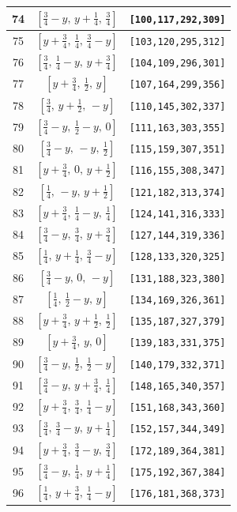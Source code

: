\documentclass[fleqn,8pt]{jsarticle}
\begin{document}
\begin{longtable}{ccc}
74 & $\left[ \frac{3}{4} - y,\, y + \frac{1}{4},\, \frac{3}{4} \right]$ & {\tt [100,117,292,309]} \\ \hline
75 & $\left[ y + \frac{3}{4},\, \frac{1}{4},\, \frac{3}{4} - y \right]$ & {\tt [103,120,295,312]} \\ \hline
76 & $\left[ \frac{3}{4},\, \frac{1}{4} - y,\, y + \frac{3}{4} \right]$ & {\tt [104,109,296,301]} \\ \hline
77 & $\left[ y + \frac{3}{4},\, \frac{1}{2},\, y \right]$ & {\tt [107,164,299,356]} \\ \hline
78 & $\left[ \frac{3}{4},\, y + \frac{1}{2},\, - y \right]$ & {\tt [110,145,302,337]} \\ \hline
79 & $\left[ \frac{3}{4} - y,\, \frac{1}{2} - y,\, 0 \right]$ & {\tt [111,163,303,355]} \\ \hline
80 & $\left[ \frac{3}{4} - y,\, - y,\, \frac{1}{2} \right]$ & {\tt [115,159,307,351]} \\ \hline
81 & $\left[ y + \frac{3}{4},\, 0,\, y + \frac{1}{2} \right]$ & {\tt [116,155,308,347]} \\ \hline
82 & $\left[ \frac{1}{4},\, - y,\, y + \frac{1}{2} \right]$ & {\tt [121,182,313,374]} \\ \hline
83 & $\left[ y + \frac{3}{4},\, \frac{1}{4} - y,\, \frac{1}{4} \right]$ & {\tt [124,141,316,333]} \\ \hline
84 & $\left[ \frac{3}{4} - y,\, \frac{3}{4},\, y + \frac{3}{4} \right]$ & {\tt [127,144,319,336]} \\ \hline
85 & $\left[ \frac{1}{4},\, y + \frac{1}{4},\, \frac{3}{4} - y \right]$ & {\tt [128,133,320,325]} \\ \hline
86 & $\left[ \frac{3}{4} - y,\, 0,\, - y \right]$ & {\tt [131,188,323,380]} \\ \hline
87 & $\left[ \frac{1}{4},\, \frac{1}{2} - y,\, y \right]$ & {\tt [134,169,326,361]} \\ \hline
88 & $\left[ y + \frac{3}{4},\, y + \frac{1}{2},\, \frac{1}{2} \right]$ & {\tt [135,187,327,379]} \\ \hline
89 & $\left[ y + \frac{3}{4},\, y,\, 0 \right]$ & {\tt [139,183,331,375]} \\ \hline
90 & $\left[ \frac{3}{4} - y,\, \frac{1}{2},\, \frac{1}{2} - y \right]$ & {\tt [140,179,332,371]} \\ \hline
91 & $\left[ \frac{3}{4} - y,\, y + \frac{3}{4},\, \frac{1}{4} \right]$ & {\tt [148,165,340,357]} \\ \hline
92 & $\left[ y + \frac{3}{4},\, \frac{3}{4},\, \frac{1}{4} - y \right]$ & {\tt [151,168,343,360]} \\ \hline
93 & $\left[ \frac{3}{4},\, \frac{3}{4} - y,\, y + \frac{1}{4} \right]$ & {\tt [152,157,344,349]} \\ \hline
94 & $\left[ y + \frac{3}{4},\, \frac{3}{4} - y,\, \frac{3}{4} \right]$ & {\tt [172,189,364,381]} \\ \hline
95 & $\left[ \frac{3}{4} - y,\, \frac{1}{4},\, y + \frac{1}{4} \right]$ & {\tt [175,192,367,384]} \\ \hline
96 & $\left[ \frac{1}{4},\, y + \frac{3}{4},\, \frac{1}{4} - y \right]$ & {\tt [176,181,368,373]} \\
\end{longtable}
\end{document}
